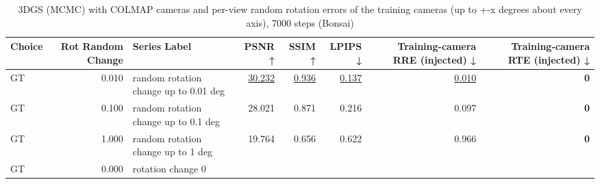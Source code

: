 \begin{table}[H]
\caption{\ifdefined\customcaption \customcaption \else 3DGS (MCMC) with COLMAP cameras and per-view random rotation errors of the training cameras (up to +-x degrees about every axis), 7000 steps (Bonsai) \fi}
\label{tab:125_colmap_rotation_error_bonsai}
\centering
\scriptsize
\begin{tabular}{lrlrrrrr}
\toprule
Choice & Rot Random Change & Series Label & PSNR ↑ & SSIM ↑ & LPIPS ↓ & Training-camera RRE (injected) ↓ & Training-camera RTE (injected) ↓ \\
\midrule
GT & 0.010 & random rotation change up to 0.01 deg & \underline{30.232} & \underline{0.936} & \underline{0.137} & \underline{0.010} & \textbf{0} \\
GT & 0.100 & random rotation change up to 0.1 deg & 28.021 & 0.871 & 0.216 & 0.097 & \textbf{0} \\
GT & 1.000 & random rotation change up to 1 deg & 19.764 & 0.656 & 0.622 & 0.966 & \textbf{0} \\
GT & 0.000 & rotation change 0%
\bottomrule
\end{tabular}
\end{table}